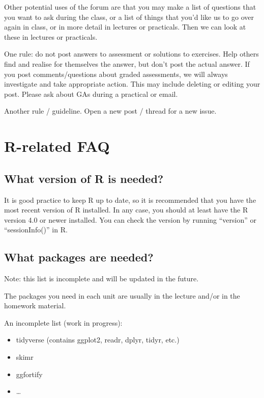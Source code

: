 \documentclass[
  letterpaper,
  8pt,
  a4paper]{book}
\providecommand{\tightlist}{%
  \setlength{\itemsep}{0pt}\setlength{\parskip}{0pt}}
\begin{document}
Other potential uses of the forum are that you may make a list of
questions that you want to ask during the class, or a list of things
that you'd like us to go over again in class, or in more detail in
lectures or practicals. Then we can look at these in lectures or
practicals.

One rule: do not post answers to assessment or solutions to exercises.
Help others find and realise for themselves the answer, but don't post
the actual answer. If you post comments/questions about graded
assessments, we will always investigate and take appropriate action.
This may include deleting or editing your post. Please ask about GAs
during a practical or email.

Another rule / guideline. Open a new post / thread for a new issue.

\section*{R-related FAQ}\label{r-related-faq}


\subsection*{What version of R is
needed?}\label{what-version-of-r-is-needed}

It is good practice to keep R up to date, so it is recommended that you
have the most recent version of R installed. In any case, you should at
least have the R version 4.0 or newer installed. You can check the
version by running ``version'' or ``sessionInfo()'' in R.

\subsection*{What packages are needed?}\label{what-packages-are-needed}

Note: this list is incomplete and will be updated in the future.

The packages you need in each unit are usually in the lecture and/or in
the homework material.

An incomplete list (work in progress):

\begin{itemize}
\tightlist
\item
  tidyverse (contains ggplot2, readr, dplyr, tidyr, etc.)
\item
  skimr
\item
  ggfortify
\item
  \ldots{}
\end{itemize}
\end{document}
